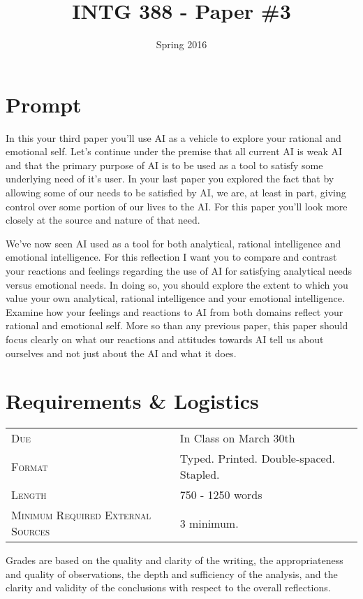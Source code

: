 \documentclass[nobib]{tufte-handout}
\title{INTG 388 - Paper \#3 }
\author{}
\date{ Spring 2016 }
\begin{document}
\maketitle

\section{Prompt}


In this your third paper you'll use AI as a vehicle to explore your rational and emotional self.  Let's continue under the premise that all current AI is weak AI and that the primary purpose of AI is to be used as a tool to satisfy some underlying need of it's user. In your last paper you explored the fact that by allowing some of our needs to be satisfied by AI, we are, at least in part, giving control over some portion of our lives to the AI.  For this paper you'll look more closely at the source and nature of that need. 

We've now seen AI used as a tool for both analytical, rational intelligence and emotional intelligence. For this reflection I want you to compare and contrast your reactions and feelings regarding the use of AI for satisfying analytical needs versus emotional needs.  In doing so, you should explore the extent to which you value your own analytical, rational intelligence and your emotional intelligence. Examine how your feelings and reactions to AI from both domains reflect your rational and emotional self. More so than any previous paper, this paper should focus clearly on what our reactions and attitudes towards AI tell us about ourselves and not just about the AI and what it does. 

\section{Requirements \& Logistics}

\begin{tabular}{ll}
\textsc{Due} & In Class on March 30th  \\
\textsc{Format} & Typed. Printed. Double-spaced. Stapled. \\
\textsc{Length} & 750 - 1250 words \\
\textsc{Minimum Required External Sources} & 3 minimum.  
\end{tabular}

\vspace{.1in}
Grades are based on the quality and clarity of the writing, the appropriateness and quality of observations, the depth and sufficiency of the analysis, and the clarity and validity of the conclusions with respect to the overall reflections.  
\end{document}
